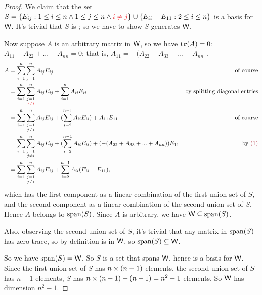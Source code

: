 \begin{proof}
We claim that the set \(S = \{ E_{ij} : 1 \le i \le n \land 1 \le j \le n \land \RED{i \ne j} \} \cup \{ E_{ii} - E_{11} : 2 \le i \le n \}\) is a basis for \(\textsf{W}\).
It's trivial that \(S\) is \LID{};
so we have to show \(S\) generates \(\textsf{W}\).

Now suppose \(A\) is an arbitrary matrix in \(\textsf{W}\), so we have \(\textbf{tr}(A) = 0\): \(A_{11} + A_{22} + ... + A_{nn} = 0\);
that is, \(A_{11} = -(A_{22} + A_{33} + ... + A_{nn}\) .
\begin{align*}
    A & = \sum_{i = 1}^n \sum_{j = 1}^n A_{ij} E_{ij} & \text{of course} \\
      & = \sum_{i = 1}^n \sum_{\substack{j = 1 \\
                       \RED{j \ne i}}}^n A_{ij} E_{ij} + \sum_{i = 1}^n A_{ii} E_{ii} & \text{by splitting diagonal entries} \\
      & = \sum_{i = 1}^n \sum_{\substack{j = 1 \\
                       j \ne i}}^n A_{ij} E_{ij} + (\sum_{i = 2}^{n - 1} A_{ii} E_{ii}) + A_{11}E_{11} & \text{of course} \\
      & = \sum_{i = 1}^n \sum_{\substack{j = 1 \\
                       j \ne i}}^n A_{ij} E_{ij} + (\sum_{i = 2}^{n - 1} A_{ii} E_{ii}) + (-(A_{22} + A_{33} + ... + A_{nn}))E_{11} & \text{by \MAROON{(1)}} \\
      & = \sum_{i = 1}^n \sum_{\substack{j = 1 \\
                       j \ne i}}^n A_{ij} E_{ij} + \sum_{i = 2}^{n - 1} A_{ii} (E_{ii} - E_{11}),
\end{align*}
which has the first component as a linear combination of the first union set of \(S\), and the second component as a linear combination of the second union set of \(S\).
Hence \(A\) belongs to \(\operatorname{span}(S)\).
Since \(A\) is arbitrary, we have \(\textsf{W} \subseteq \operatorname{span}(S)\).

Also, observing the second union set of \(S\), it's trivial that any matrix in \(\operatorname{span}(S)\) has zero trace, so by definition is in \(\textsf{W}\), so \(\operatorname{span}(S) \subseteq \textsf{W}\).

So we have \(\operatorname{span}(S) = \textsf{W}\).
So \(S\) is a \LID{} set that spans \(\textsf{W}\), hence is a basis for \(\textsf{W}\).
Since the first union set of \(S\) has \(n \times (n - 1)\) elements, the second union set of \(S\) has \(n - 1\) elements, \(S\) has \(n \times (n - 1) + (n - 1) = n^2 - 1\) elements.
So \(\textsf{W}\) has dimension \(n^2 - 1\).
\end{proof}


